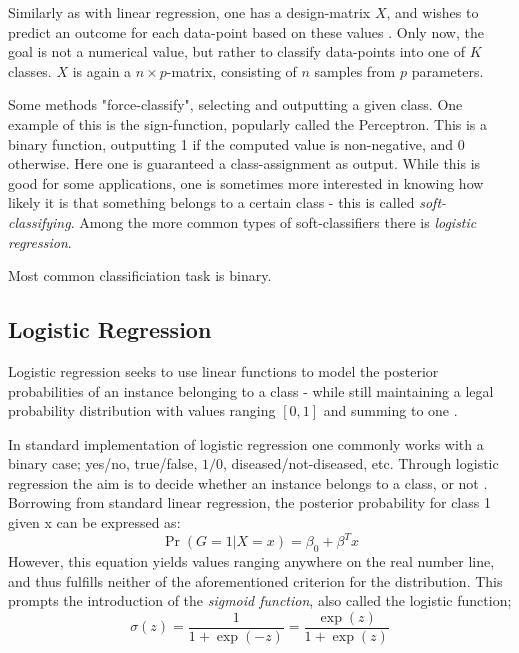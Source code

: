 Similarly as with linear regression, one has a design-matrix $X$, and wishes to predict an outcome for each data-point based on these values \cite[Logistic Regression]{morten}. Only now, the goal is not a numerical value, but rather to classify data-points into one of $K$ classes. $X$ is again a $n\times p$-matrix, consisting of $n$ samples from $p$ parameters.

Some methods "force-classify", selecting and outputting a given class. One example of this is the sign-function, popularly called the Perceptron. This is a binary function, outputting 1 if the computed value is non-negative, and 0 otherwise. Here one is guaranteed a class-assignment as output. 
While this is good for some applications, one is sometimes more interested in knowing how likely it is that something belongs to a certain class - this is called \textit{soft-classifying}. Among the more common types of soft-classifiers there is \textit{logistic regression}. 

Most common classificiation task is binary. 

\subsection{Logistic Regression}
Logistic regression seeks to use linear functions to model the posterior probabilities of an instance belonging to a class - while still maintaining a legal probability distribution with values ranging $[0,1]$ and summing to one \cite[p.119]{hastie}. 

In standard implementation of logistic regression one commonly works with a binary case; yes/no, true/false, $1/0$, diseased/not-diseased, etc. Through logistic regression the aim is to decide whether an instance belongs to a class, or not \cite[p. 78]{jm3}.  
Borrowing from standard linear regression, the posterior probability for class 1 given x can be expressed as:  
\begin{equation}
\Pr(G=1|X=x)=\beta_0+\beta^Tx
\end{equation} 
However, this equation yields values ranging anywhere on the real number line, and thus fulfills neither of the aforementioned criterion for the distribution. This prompts the introduction of the \textit{sigmoid function}, also called the logistic function;
\begin{equation}\label{sigmoid}
    \sigma(z)=\frac{1}{1+\exp(-z)}=\frac{\exp(z)}{1+\exp(z)}
\end{equation}

